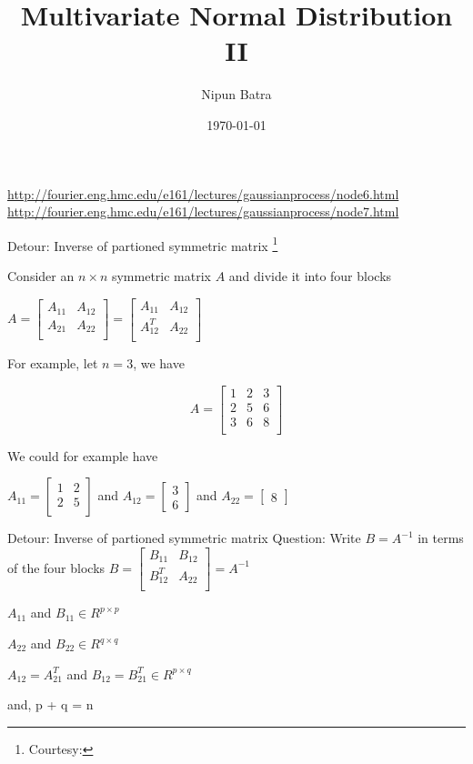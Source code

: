 \documentclass{beamer}
\title{Multivariate Normal Distribution II}
\date{\today}
\author{Nipun Batra}
\institute{IIT Gandhinagar}
\begin{document}
	\maketitle
	
	\urldef\nodeSix\url{http://fourier.eng.hmc.edu/e161/lectures/gaussianprocess/node6.html}
	\urldef\nodeSeven\url{http://fourier.eng.hmc.edu/e161/lectures/gaussianprocess/node7.html}
	
	
	\begin{frame}{Detour: Inverse of partioned symmetric matrix \footnote{Courtesy: \nodeSix}}
		
		Consider an $n\times n$ symmetric matrix $A$ and divide it into four blocks
		
		$
		A = \begin{bmatrix}
		A_{11} & A_{12}\\
		A_{21} & A_{22} \\
		\end{bmatrix} =  \begin{bmatrix}
		A_{11} & A_{12}\\
		A_{12}^T & A_{22} \\
		\end{bmatrix}
		$
		
		For example, let $n=3$, we have
		
		$$
		A =  \begin{bmatrix}
		1 & 2 & 3\\
		2 & 5 & 6 \\
		3 & 6 & 8 \\
		
	\end{bmatrix}
	$$
	
	We could for example have 
	
	$A_{11} = \begin{bmatrix}
	1 & 2 \\
	2 & 5 \\
	\end{bmatrix}$ and $A_{12} = \begin{bmatrix}
	3 \\ 6
	\end{bmatrix}
	$ and $A_{22} = \begin{bmatrix}
	8
	\end{bmatrix}$
\end{frame}

\begin{frame}{Detour: Inverse of partioned symmetric matrix}
	Question: Write $B = A^{-1}$ in terms of the four blocks
	$
	B = \begin{bmatrix}
	B_{11} & B_{12}\\
	B_{12}^T & A_{22} \\
	\end{bmatrix}
	= A^{-1}$
	
	$A_{11}$ and $B_{11} \in R^{p\times p}$ 
	
	$A_{22}$ and $B_{22} \in R^{q\times q}$
	
	$A_{12} = A_{21}^T$ and $B_{12} = B_{21}^T \in R^{p\times q}$
	
	and, p + q = n 
	
\end{frame}
\end{document}
